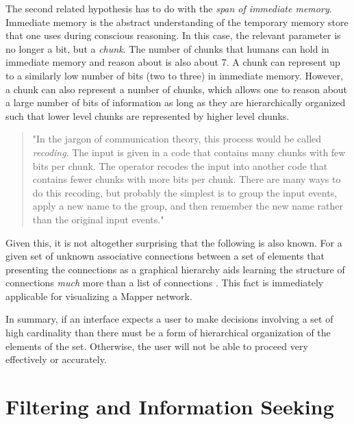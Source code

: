 The second related hypothesis has to do with the \emph{span of immediate memory}. Immediate memory is the abstract understanding of the temporary memory store that one uses during conscious reasoning. In this case, the relevant parameter is no longer a bit, but a \emph{chunk}. The number of chunks that humans can hold in immediate memory and reason about is also about 7. A chunk can represent up to a similarly low number of bits (two to three) in immediate memory. However, a chunk can also represent a number of chunks, which allows one to reason about a large number of bits of information as long as they are hierarchically organized such that lower level chunks are represented by higher level chunks.

\begin{quote}
"In the jargon of communication theory, this process would be called \emph{recoding}. The input is given in a code that contains many chunks with few bits per chunk. The operator recodes the input into another code that contains fewer chunks with more bits per chunk. There are many ways to do this recoding, but probably the simplest is to group the input events, apply a new name to the group, and then remember the new name rather than the original input events." \cite{seven1956}
\end{quote}

Given this, it is not altogether surprising that the following is also known. For a given set of unknown associative connections between a set of elements that presenting the connections as a graphical hierarchy aids learning the structure of connections \emph{much} more than a list of connections \cite{graphicalhierarchy1972}. This fact is immediately applicable for visualizing a Mapper network.

In summary, if an interface expects a user to make decisions involving a set of high cardinality than there must be a form of hierarchical organization of the elements of the set. Otherwise, the user will not be able to proceed very effectively or accurately.

\section{Filtering and Information Seeking}

\begin{comment}
The Structure of the Information Visualization Design Space, Section 5
dynamic queries technique 

Visual Information Seeking: Tight Coupling of Dynamic Query Filters with Starfield Displays
\end{comment}

